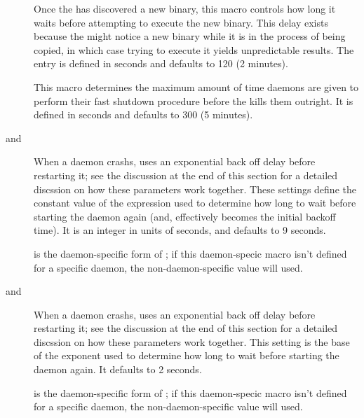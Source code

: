 \begin{description}
\item[]
  \label{param:MasterNewBinaryDelay} Once the  has
  discovered a new binary, this macro controls how long it waits
  before attempting to execute the new binary.  This delay exists
  because the  might notice a new binary while it
  is in the process of being copied,
  in which case trying to execute it yields
  unpredictable results.  The entry is defined in seconds and
  defaults to 120 (2 minutes).

\item[]
  \label{param:ShutdownFastTimeout} This macro determines the maximum
  amount of time daemons are given to perform their
  fast shutdown procedure before the  kills them
  outright.  It is defined in seconds and defaults to 300 (5 minutes).

\item[ and
  ]
  \label{param:MasterBackoffConstant}
  When a daemon crashs,  uses an exponential back off
  delay before restarting it; see the discussion at the end of this
  section for a detailed discssion on how these parameters work together.
  These settings define the constant value of the expression used to
  determine how long to wait before starting the daemon again (and,
  effectively becomes the initial backoff time).  It is an integer in
  units of seconds, and defaults to 9 seconds.

   is the daemon-specific
  form of ; if this daemon-specic
  macro isn't defined for a specific daemon, the non-daemon-specific
  value will used.

\item[ and
      ]
  \label{param:MasterBackoffFactor}
  When a daemon crashs,  uses an exponential back off
  delay before restarting it; see the discussion at the end of this
  section for a detailed discssion on how these parameters work together.
  This setting is the base of the
  exponent used to determine how long to wait before starting the
  daemon again.  It defaults to 2 seconds.

   is the daemon-specific
  form of ; if this daemon-specic
  macro isn't defined for a specific daemon, the non-daemon-specific
  value will used.


\end{description}
